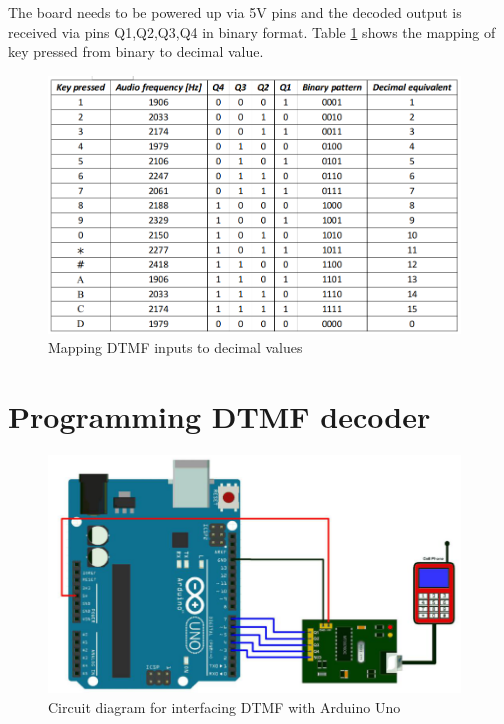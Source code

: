 \par The board needs to be powered up via 5V pins and the decoded output is received via pins Q1,Q2,Q3,Q4 in binary format. Table \ref{fig:dtmf_map} shows the mapping of key pressed from binary to decimal value.
\begin{figure}
    \centering
    \includegraphics[width=4.3in]{Tables/DTMF/dtmf_pattern.png}
    \caption[DTMF pattern]{Mapping \ac{DTMF} inputs to decimal values}
    \label{fig:dtmf_map}
\end{figure}

\section{Programming DTMF decoder}
\begin{figure}
    \centering
    \includegraphics[width=4.3in]{Images/DTMF/DTMF_ckt.png}
    \caption[DTMF with Arduino]{Circuit diagram for interfacing \ac{DTMF} with Arduino Uno }
    \label{fig:dtmf_ckt}
\end{figure}

